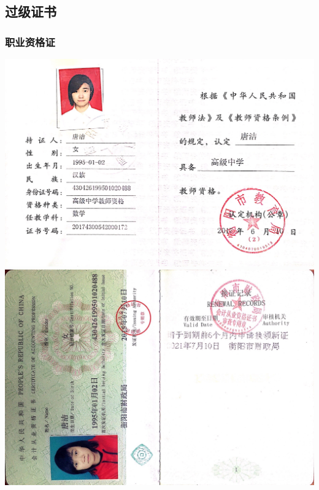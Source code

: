 \documentclass[UFT8]{ctexart}%
\begin{document}



\subsection{过级证书}
\subsubsection{职业资格证}
\begin{center}
\includegraphics[scale=0.20]{figs/教师资格证.jpg }
\includegraphics[scale=0.2]{figs/2015-07.jpg }
\end{center}
\end{document}
